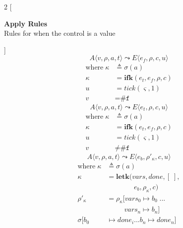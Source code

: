 \documentclass[12pt,draft]{article}
\newcommand{\falsesyn}{\texttt{\#f}}
\begin{document}
\newpage


\begin{multicols*}{2}
[
\begin{center}
\textbf{Apply Rules} \\
Rules for when the control is a value
\end{center}
]
\[
A\langle
v , \rho , a , t
\rangle
\leadsto
E\langle
e_f , \rho , c , u
\rangle
\]
\vspace{-12mm}
\begin{align*}
\text{where}\; \kappa &\triangleq \sigma(a) \\
\kappa &= \textbf{ifk}(e_t, e_f, \rho, c) \\
u &= tick(\varsigma, 1) \\
v &= \falsesyn
\end{align*}
\[
A\langle
v , \rho , a , t
\rangle
\leadsto
E\langle
e_t , \rho , c , u
\rangle
\]
\vspace{-10mm}
\begin{align*}
\text{where}\; \kappa &\triangleq \sigma(a) \\
\kappa &= \textbf{ifk}(e_t, e_f, \rho, c) \\
u &= tick(\varsigma, 1) \\
v &\not= \falsesyn
\end{align*}
\[
A\langle
v , \rho , a , t
\rangle
\leadsto
E\langle
e_b , \rho'_{\kappa} , c , u
\rangle
\]
\vspace{-10mm}
\begin{align*}
\text{where}\; \kappa &\triangleq \sigma(a) \\
\kappa &= \textbf{letk}(vars, done, [\;],\\
&\;\;\;\;\;\;\;\;\;\;\;\;\;\; e_b , \rho_{\kappa}, c) \\
\rho'_{\kappa} &= \rho_{\kappa}[vars_0 \mapsto b_0\;...\\
&\;\;\;\;\;\;\;\;\;  vars_n \mapsto b_n] \\
\sigma[b_0 &\mapsto done_i ... b_n \mapsto done_n] \\

\end{align*}
\end{multicols*}
\end{document}

